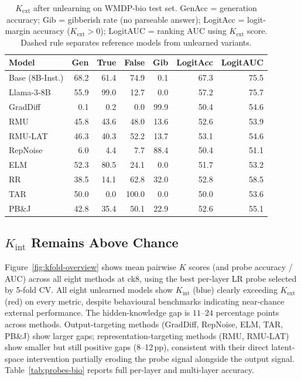 \documentclass[11pt]{article}
\begin{document}
\begin{table}[t]
\centering
\caption{$K_\text{ext}$ after unlearning on WMDP-bio test set.
GenAcc = generation accuracy; Gib = gibberish rate (no parseable answer);
LogitAcc = logit-margin accuracy ($K_\text{ext} > 0$); LogitAUC = ranking AUC
using $K_\text{ext}$ score. Dashed rule separates reference models from
unlearned variants.}
\label{tab:gen-logit}
\small
\setlength{\tabcolsep}{8pt}
\begin{tabular}{lrrrrrr}
\toprule
\textbf{Model} & \textbf{Gen} & \textbf{True} & \textbf{False} & \textbf{Gib}
               & \textbf{LogitAcc} & \textbf{LogitAUC} \\
\midrule
Base (8B-Inst.)  & 68.2 & 61.4 & 74.9 &  0.1 & 67.3 & 75.5 \\
Llama-3-8B       & 55.9 & 99.0 & 12.7 &  0.0 & 57.2 & 75.7 \\
\midrule
GradDiff  &  0.1 &  0.2 &  0.0 & 99.9 & 50.4 & 54.6 \\
RMU       & 45.8 & 43.6 & 48.0 & 13.6 & 52.6 & 53.9 \\
RMU-LAT   & 46.3 & 40.3 & 52.2 & 13.7 & 53.1 & 54.6 \\
RepNoise  &  6.0 &  4.4 &  7.7 & 88.4 & 50.4 & 51.1 \\
ELM       & 52.3 & 80.5 & 24.1 &  0.0 & 51.7 & 53.2 \\
RR        & 38.5 & 14.1 & 62.8 & 32.0 & 52.8 & 58.5 \\
TAR       & 50.0 &  0.0 &100.0 &  0.0 & 50.0 & 53.6 \\
PB\&J     & 42.8 & 35.4 & 50.1 & 22.9 & 52.6 & 55.1 \\
\bottomrule
\end{tabular}
\end{table}

\subsection{$K_\text{int}$ Remains Above Chance}
\label{sec:probe-global}

Figure~\ref{fig:kfold-overview} shows mean pairwise $K$ scores (and probe
accuracy / AUC) across all eight methods at ck8, using the best per-layer LR
probe selected by 5-fold CV.
All eight unlearned models show $K_\text{int}$ (blue) clearly exceeding
$K_\text{ext}$ (red) on every metric, despite behavioural benchmarks indicating
near-chance external performance.
The hidden-knowledge gap is $11$--$24$ percentage points across methods.
Output-targeting methods (GradDiff, RepNoise, ELM, TAR, PB\&J) show larger gaps;
representation-targeting methods (RMU, RMU-LAT) show smaller but still
positive gaps (8--12\,pp), consistent with their direct latent-space intervention
partially eroding the probe signal alongside the output signal.
Table~\ref{tab:probes-bio} reports full per-layer and multi-layer accuracy.
\end{document}

